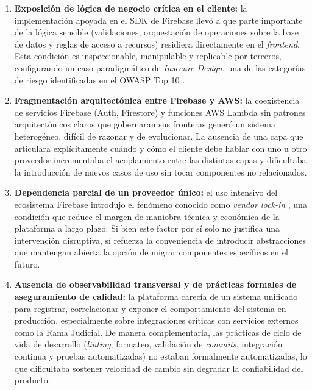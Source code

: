 \begin{enumerate}
  \item \textbf{Exposición de lógica de negocio crítica en el cliente:} la implementación apoyada en el SDK de Firebase llevó a que parte importante de la lógica sensible (validaciones, orquestación de operaciones sobre la base de datos y reglas de acceso a recursos) residiera directamente en el \textit{frontend}. Esta condición es inspeccionable, manipulable y replicable por terceros, configurando un caso paradigmático de \textit{Insecure Design}, una de las categorías de riesgo identificadas en el OWASP Top 10 \cite{OWASP2021}.

  \item \textbf{Fragmentación arquitectónica entre Firebase y AWS:} la coexistencia de servicios Firebase (Auth, Firestore) y funciones AWS Lambda sin patrones arquitectónicos claros que gobernaran sus fronteras generó un sistema heterogéneo, difícil de razonar y de evolucionar. La ausencia de una capa que articulara explícitamente cuándo y cómo el cliente debe hablar con uno u otro proveedor incrementaba el acoplamiento entre las distintas capas y dificultaba la introducción de nuevos casos de uso sin tocar componentes no relacionados.

  \item \textbf{Dependencia parcial de un proveedor único:} el uso intensivo del ecosistema Firebase introdujo el fenómeno conocido como \textit{vendor lock-in} \cite{OparaMartins2016, OparaMartins2014, Harauzek2022}, una condición que reduce el margen de maniobra técnica y económica de la plataforma a largo plazo. Si bien este factor por sí solo no justifica una intervención disruptiva, sí refuerza la conveniencia de introducir abstracciones que mantengan abierta la opción de migrar componentes específicos en el futuro.

  \item \textbf{Ausencia de observabilidad transversal y de prácticas formales de aseguramiento de calidad:} la plataforma carecía de un sistema unificado para registrar, correlacionar y exponer el comportamiento del sistema en producción, especialmente sobre integraciones críticas con servicios externos como la Rama Judicial. De manera complementaria, las prácticas de ciclo de vida de desarrollo (\textit{linting}, formateo, validación de \textit{commits}, integración continua y pruebas automatizadas) no estaban formalmente automatizadas, lo que dificultaba sostener velocidad de cambio sin degradar la confiabilidad del producto.
\end{enumerate}

